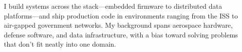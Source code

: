 \noindent I build systems across the stack---embedded firmware to distributed data
platforms---and ship production code in environments ranging from the ISS to
air-gapped government networks. My background spans aerospace hardware, defense
software, and data infrastructure, with a bias toward solving problems that
don't fit neatly into one domain.
